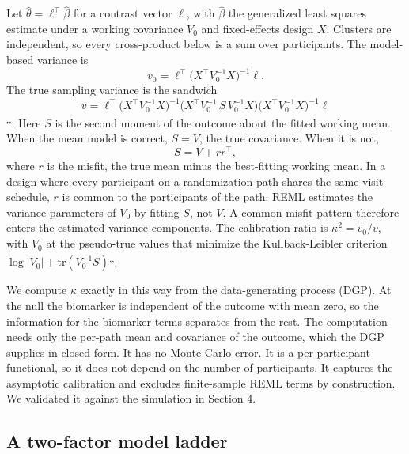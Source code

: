 \documentclass[
  11pt,
]{article}
\begin{document}
Let \(\hat\theta = \ell^\top\hat\beta\) for a contrast vector \(\ell\),
with \(\hat\beta\) the generalized least squares estimate under a
working covariance \(V_0\) and fixed-effects design \(X\). Clusters are
independent, so every cross-product below is a sum over participants.
The model-based variance is
\begin{equation}
v_0 = \ell^\top\bigl(X^\top V_0^{-1} X\bigr)^{-1}\ell .
\label{eq:v0}
\end{equation}
The true sampling variance is the sandwich
\begin{equation}
v = \ell^\top\bigl(X^\top V_0^{-1} X\bigr)^{-1}
\bigl(X^\top V_0^{-1}\, S\, V_0^{-1} X\bigr)
\bigl(X^\top V_0^{-1} X\bigr)^{-1}\ell
\label{eq:vsand}
\end{equation}\textsuperscript{,,}. Here \(S\) is the second moment of
the outcome about the fitted working mean. When the mean model is
correct, \(S = V\), the true covariance. When it is not,
\begin{equation}
S = V + r r^\top ,
\label{eq:vrr}
\end{equation}
where \(r\) is the misfit, the true mean minus the best-fitting working
mean. In a design where every participant on a randomization path
shares the same visit schedule, \(r\) is common to the participants of
the path. REML estimates the variance parameters of \(V_0\) by fitting
\(S\), not \(V\). A common misfit pattern therefore enters the estimated
variance components. The calibration ratio is \(\kappa^2 = v_0/v\),
with \(V_0\) at the pseudo-true values that minimize the
Kullback-Leibler criterion \(\log|V_0| + \mathrm{tr}(V_0^{-1} S)\)\textsuperscript{,,}.

We compute \(\kappa\) exactly in this way from the data-generating
process (DGP). At the null the biomarker is independent of the
outcome with mean zero, so the information for the biomarker terms
separates from the rest. The computation needs only the per-path mean
and covariance of the outcome, which the DGP supplies in closed form.
It has no Monte Carlo error. It is a per-participant functional, so
it does not depend on the number of participants. It captures the
asymptotic calibration and excludes finite-sample REML terms by
construction. We validated it against the simulation in Section 4.

\subsection{A two-factor model ladder}\label{a-two-factor-model-ladder}
\end{document}
